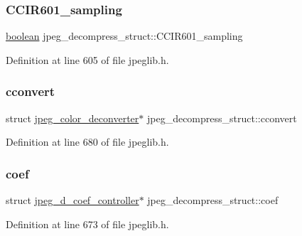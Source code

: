 \mbox{\label{structjpeg__decompress__struct_a57c63b368b579dc76944fe6dba1ecc96}} 
\subsubsection{\texorpdfstring{CCIR601\_sampling}{CCIR601\_sampling}}
{\footnotesize\ttfamily \mbox{\hyperlink{jmorecfg_8h_a7c6368b321bd9acd0149b030bb8275ed}{boolean}} jpeg\+\_\+decompress\+\_\+struct\+::\+C\+C\+I\+R601\+\_\+sampling}



Definition at line 605 of file jpeglib.\+h.

\mbox{\label{structjpeg__decompress__struct_a1f88347e58f8f9d93954aa885f3497fb}} 
\subsubsection{\texorpdfstring{cconvert}{cconvert}}
{\footnotesize\ttfamily struct \mbox{\hyperlink{structjpeg__color__deconverter}{jpeg\+\_\+color\+\_\+deconverter}}$\ast$ jpeg\+\_\+decompress\+\_\+struct\+::cconvert}



Definition at line 680 of file jpeglib.\+h.

\mbox{\label{structjpeg__decompress__struct_a25ff493a838c250917bf874a70bdb6f2}} 
\subsubsection{\texorpdfstring{coef}{coef}}
{\footnotesize\ttfamily struct \mbox{\hyperlink{structjpeg__d__coef__controller}{jpeg\+\_\+d\+\_\+coef\+\_\+controller}}$\ast$ jpeg\+\_\+decompress\+\_\+struct\+::coef}



Definition at line 673 of file jpeglib.\+h.

